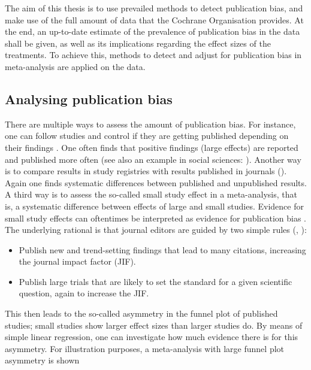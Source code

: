 \documentclass[11pt,a4paper,twoside]{book}\usepackage[]{graphicx}\usepackage[]{color}
\begin{document}
The aim of this thesis is to use prevailed methods to detect publication bias, and make use of the full amount of data that the Cochrane Organisation provides. At the end, an up-to-date estimate of the prevalence of publication bias in the data shall be given, as well as its implications regarding the effect sizes of the treatments. To achieve this, methods to detect and adjust for publication bias in meta-analysis are applied on the data.

\subsection{Analysing publication bias}
There are multiple ways to assess the amount of publication bias. For instance, one can follow studies and control if they are getting published depending on their findings \citep{publication.fate}. One often finds that positive findings (\ie large effects) are reported and published more often (see also an example in social sciences: \citet{social.sciences.publication.bias}). Another way is to compare results in study registries with results published in journals (\eg \citet{pb.clinicalscience.2013}). Again one finds systematic differences between published and unpublished results. \\
A third way is to assess the so-called small study effect in a meta-analysis, that is, a systematic difference between effects of large and small studies. Evidence for small study effects can oftentimes be interpreted as evidence for publication bias \citep{Egger}. The underlying rational is that journal editors are guided by two simple rules (\citet{excess.significance}, \citet{ioannidis.2019}): 
\begin{itemize}
\item Publish new and trend-setting findings that lead to many citations, increasing the journal impact factor (JIF).
\item Publish large trials that are likely to set the standard for a given scientific question, again to increase the JIF.
\end{itemize}
This then leads to the so-called asymmetry in the funnel plot of published studies; small studies show larger effect sizes than larger studies do. By means of simple linear regression, one can investigate how much evidence there is for this asymmetry. For illustration purposes, a meta-analysis with large funnel plot asymmetry is shown %
\end{document}
